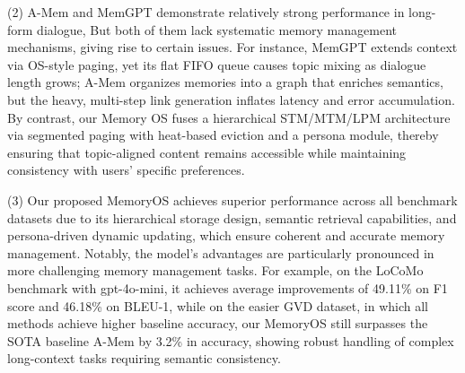 \documentclass[11pt]{article}
\begin{document}
(2) A-Mem and MemGPT demonstrate relatively strong performance in long-form dialogue, But both of them lack systematic memory management mechanisms, giving rise to certain issues. For instance, MemGPT extends context via OS-style paging, yet its flat FIFO queue causes topic mixing as dialogue length grows; A-Mem organizes memories into a graph that enriches semantics, but the heavy, multi-step link generation inflates latency and error accumulation.
By contrast, our Memory OS fuses a hierarchical STM/MTM/LPM architecture via segmented paging with heat-based eviction and a persona module, thereby ensuring that topic-aligned content remains accessible while maintaining consistency with users' specific preferences.

(3) Our proposed MemoryOS achieves superior performance across all benchmark datasets due to its hierarchical storage design, semantic retrieval capabilities, and persona-driven dynamic updating, which ensure coherent and accurate memory management. 
Notably, the model’s advantages are particularly pronounced in more challenging memory management tasks. For example, on the LoCoMo benchmark with gpt-4o-mini, it achieves average improvements of 49.11\%  on  F1 score and 46.18\%  on BLEU-1,  while on the easier GVD dataset, in which all methods achieve higher baseline accuracy, our MemoryOS still surpasses the SOTA baseline A-Mem by 3.2\%  in accuracy, showing robust handling of complex long-context tasks requiring semantic consistency.




\end{document}
